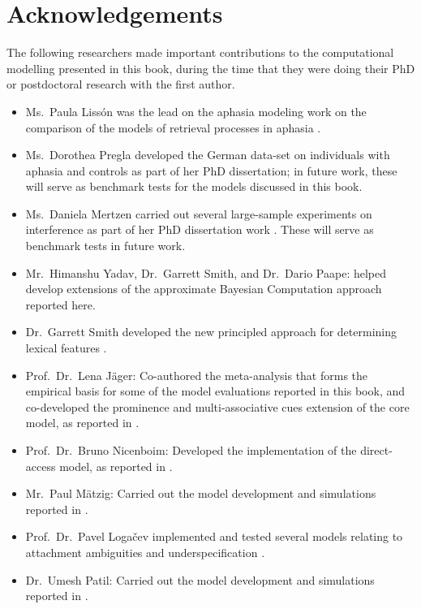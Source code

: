 
\chapter*{Acknowledgements}

The following researchers made important contributions to the  computational modelling presented in this book, during the time that they were doing their PhD or postdoctoral research with the first author.
\begin{itemize}
\item Ms.\ Paula Liss{\'o}n was the lead on the aphasia modeling work on the comparison of the models of retrieval processes in aphasia \citep{LissonEtAl2020}.
\item Ms.\ Dorothea Pregla developed the German data-set on individuals with aphasia and  controls as part of her PhD dissertation; in future work, these will serve as benchmark tests for the models discussed in this book.
\item Ms.\ Daniela Mertzen carried out several large-sample experiments on interference as part of her PhD dissertation work \citep{MertzenEtAlAMLaP2019}.  These will serve as benchmark tests in future work.
\item Mr.\ Himanshu Yadav, Dr.\ Garrett Smith, and Dr.\ Dario Paape: helped develop extensions of the approximate Bayesian Computation approach  reported here. 
\item Dr.\ Garrett Smith developed the new principled approach for determining lexical features \citep{smith2019smithvasishthfeatures}. 
\item Prof.\ Dr.\  Lena J\"ager: Co-authored the meta-analysis \citep{JaegerEngelmannVasishth2017} that forms the empirical basis for some of the model evaluations reported in this book, and co-developed the prominence and multi-associative cues extension of the core model, as reported in \cite{EngelmannJaegerVasishth2019}.
\item Prof.\ Dr.\  Bruno  Nicenboim: Developed the implementation of the direct-access model, as reported in \cite{NicenboimRetrieval2018}.
 \item Mr.\ Paul M\"atzig: Carried out the model development and simulations reported in \cite{MaetzigEtAltopics2018}.
 \item Prof.\ Dr.\ Pavel Loga{\v c}ev implemented and tested several models relating to attachment ambiguities and underspecification \citep{LogacevMultiple,LogacevVasishthQJEP2016}. 
 \item Dr.\ Umesh Patil: Carried out the model development and simulations reported in \cite{PatilEtAl2016}.
 \end{itemize}

